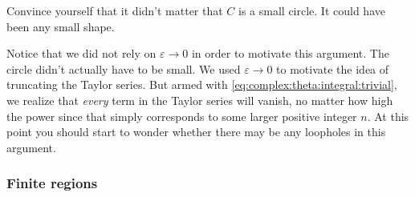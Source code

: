 \begin{exercise}
Convince yourself that it didn't matter that $C$ is a small circle. It could have been any small shape. 
\end{exercise}
Notice that we did not rely on $\varepsilon\to 0$ in order to motivate this argument. The circle didn't actually have to be small. We used $\varepsilon\to 0$ to motivate the idea of truncating the Taylor series. But armed with \eqref{eq:complex:theta:integral:trivial}, we realize that \emph{every} term in the Taylor series will vanish, no matter how high the power since that simply corresponds to some larger positive integer $n$. At this point you should start to wonder whether there may be any loopholes in this argument.

\subsubsection{Finite regions}


